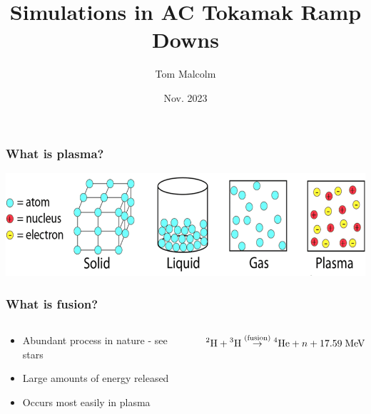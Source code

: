 \documentclass{beamer}
\title{Simulations in AC Tokamak Ramp Downs}
\author{Tom Malcolm}
\institute{(The talk edition)}
\date{Nov. 2023}
\begin{document}
\frame{\titlepage}

\begin{frame}
\frametitle{What is plasma?}

\includegraphics[scale=0.35]{imgs/plasma-graphic.png}

\end{frame}

\begin{frame}

\frametitle{What is fusion?}
\begin{columns}[T]

    \begin{column}{.5\textwidth}
        \begin{itemize}
            \item Abundant process in nature - see stars
            \item Large amounts of energy released
            \item Occurs most easily in plasma
        \end{itemize}
    \end{column}
    \vline\hspace{1em}

    \begin{column}{.5\textwidth}
        $$\prescript{2}{}{\text{H}} + \prescript{3}{}{\text{H}} \stackrel{\text{(fusion)}}{\to} \prescript{4}{}{\text{He}} + n + 17.59\;\text{MeV}$$
    \end{column}

\end{columns}

\end{frame}
\end{document}
